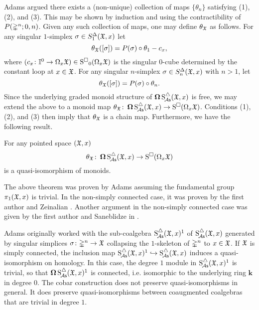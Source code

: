 Adams argued there exists a (non-unique) collection of maps $\{\theta_n\}$ satisfying (1), (2), and (3). This may be shown by induction and using the contractibility of $P(\mathbb{\Delta}^n; 0,n)$. Given any such collection of maps, one may define $\theta_{\mathfrak{X}}$ as follows. For any singular $1$-simplex $\sigma \in S^{\Delta}_1(\mathfrak{X},x)$ let
\[
\theta_{\mathfrak{X}}([\sigma]) = P(\sigma) \circ \theta_1 - c_x,
\]
where $(c_x \colon \mathbb{I}^0 \to \Omega_x\mathfrak{X}) \in \operatorname{S^{\square}}_0(\Omega_x \mathfrak{X})$ is the singular $0$-cube determined by the constant loop at $x \in \mathfrak{X}$.
For any singular $n$-simplex $\sigma \in S^{\Delta}_n(\mathfrak{X},x)$ with $n>1$, let
\[
\theta_{\mathfrak{X}}([\sigma]) = P(\sigma) \circ \theta_n.
\]
Since the underlying graded monoid structure of $\operatorname{\mathbf{\Omega}} \operatorname{S^{\triangle}_{\!{\mathcal{A}\mathsf{s}}}}(\mathfrak{X},x)$ is free, we may extend the above to a monoid map $\theta_{\mathfrak{X}} \colon \operatorname{\mathbf{\Omega}} \operatorname{S^{\triangle}_{\!{\mathcal{A}\mathsf{s}}}}(\mathfrak{X},x) \to \operatorname{S^{\square}}(\Omega_x \mathfrak{X})$.
Conditions (1), (2), and (3) then imply that $\theta_{\mathfrak{X}}$ is a chain map.
Furthermore, we have the following result.

\begin{proposition}
    For any pointed space $(\mathfrak{X},x)$
    \[
    \theta_{\mathfrak{X}} \colon \operatorname{\mathbf{\Omega}} \operatorname{S^{\triangle}_{\!{\mathcal{A}\mathsf{s}}}}(\mathfrak{X},x) \to \operatorname{S^{\square}}(\Omega_x \mathfrak{X})
    \]
    is a quasi-isomorphism of monoids. 
\end{proposition}

The above theorem was proven by Adams assuming the fundamental group $\pi_1(\mathfrak{X},x)$ is trivial. In the non-simply connected case, it was proven by the first author and Zeinalian \cite{rivera2018rigidification}. Another argument in the non-simply connected case was given by the first author and Saneblidze in \cite{rivera2019path}. 

\begin{remark}
    Adams originally worked with the sub-coalgebra $\operatorname{S^{\triangle}_{\!{\mathcal{A}\mathsf{s}}}}(\mathfrak{X},x)^1$ of $\operatorname{S^{\triangle}_{\!{\mathcal{A}\mathsf{s}}}}(\mathfrak{X},x)$ generated by singular simplices $\sigma \colon \mathbb{\Delta}^n \to \mathfrak{X}$ collapsing the $1$-skeleton of $\mathbb{\Delta}^n$ to $x \in \mathfrak{X}$. If $\mathfrak{X}$ is simply connected, the inclusion map $\operatorname{S^{\triangle}_{\!{\mathcal{A}\mathsf{s}}}}(\mathfrak{X},x)^1  \hookrightarrow \operatorname{S^{\triangle}_{\!{\mathcal{A}\mathsf{s}}}}(\mathfrak{X},x)$ induces a quasi-isomorphism on homology. In this case, the degree $1$ module in $\operatorname{S^{\triangle}_{\!{\mathcal{A}\mathsf{s}}}}(\mathfrak{X},x)^1$ is trivial, so that $\operatorname{\mathbf{\Omega}} \operatorname{S^{\triangle}_{\!{\mathcal{A}\mathsf{s}}}}(\mathfrak{X},x)^1$ is connected, i.e. isomorphic to the underlying ring $\mathbf{k}$ in degree $0$. The cobar construction does not preserve quasi-isomorphisms in general. It does preserve quasi-isomorphisms between coaugmented coalgebras that are trivial in degree $1$.
\end{remark}

